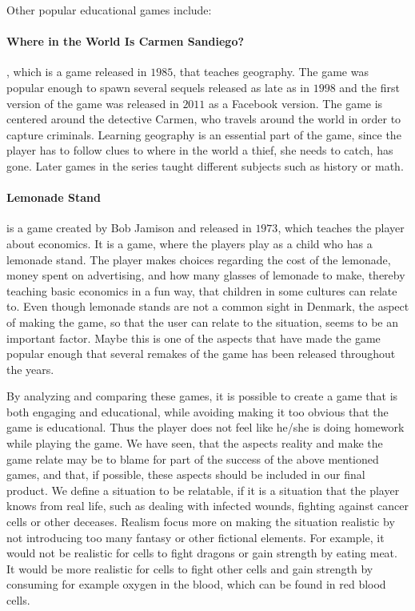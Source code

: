 Other popular educational games include:

\paragraph{Where in the World Is Carmen Sandiego?}, which is a game released in $1985$, that teaches geography.
The game was popular enough to spawn several sequels released as late as in $1998$ and the first version of the game was released in $2011$ as a Facebook version.\cite{carmensandiego}
The game is centered around the detective Carmen, who travels around the world in order to capture criminals.
Learning geography is an essential part of the game, since the player has to follow clues to where in the world a thief, she needs to catch, has gone. Later games in the series taught different subjects such as history or math.

\paragraph{Lemonade Stand} is a game created by Bob Jamison and released in $1973$, which teaches the player about economics.\cite{lemonadestand}
It is a game, where the players play as a child who has a lemonade stand.
The player makes choices regarding the cost of the lemonade, money spent on advertising, and how many glasses of lemonade to make, thereby teaching basic economics in a fun way, that children in some cultures can relate to.
Even though lemonade stands are not a common sight in Denmark, the aspect of making the game, so that the user can relate to the situation, seems to be an important factor.
Maybe this is one of the aspects that have made the game popular enough that several remakes of the game has been released throughout the years.\newline

By analyzing and comparing these games, it is possible to create a game that is both engaging and educational, while avoiding making it too obvious that the game is educational.
Thus the player does not feel like he/she is doing homework while playing the game.
We have seen, that the aspects reality and make the game relate may be to blame for part of the success of the above mentioned games, and that, if possible, these aspects should be included in our final product.
We define a situation to be relatable, if it is a situation that the player knows from real life, such as dealing with infected wounds, fighting against cancer cells or other deceases. Realism focus more on making the situation realistic by not introducing too many fantasy or other fictional elements. For example, it would not be realistic for cells to fight dragons or gain strength by eating meat. It would be more realistic for cells to fight other cells and gain strength by consuming for example oxygen in the blood, which can be found in red blood cells.

